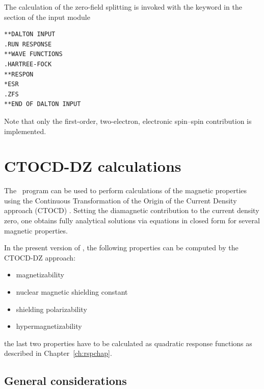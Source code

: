 \begin{center}
\end{center}
The calculation of the zero-field splitting is invoked
with the keyword  in the
 section of the  input module
\begin{verbatim}
**DALTON INPUT
.RUN RESPONSE
**WAVE FUNCTIONS
.HARTREE-FOCK
**RESPON
*ESR
.ZFS
**END OF DALTON INPUT
\end{verbatim}
Note that only the first-order, two-electron, electronic spin--spin contribution
is implemented.

\section{CTOCD-DZ calculations}\label{sec:ctocd}

The \dalton\ program can be used to perform calculations of the magnetic
properties using the Continuous Transformation of the Origin of the Current Density
approach (CTOCD) . Setting the diamagnetic contribution
to the current density zero, one obtains fully analytical solutions via equations
in closed form for several magnetic properties.


In the present version of \dalton, the following properties can be computed by
the CTOCD-DZ approach:

\begin{center}
\begin{itemize}{}{}
\item magnetizability
\item nuclear magnetic shielding constant
\item shielding polarizability
\item hypermagnetizability
\end{itemize}
\end{center}
the last two properties have to be calculated as quadratic response functions as described
in Chapter~\ref{ch:rspchap}.

\subsection{General considerations}\label{sec:ctocdgeneral}

